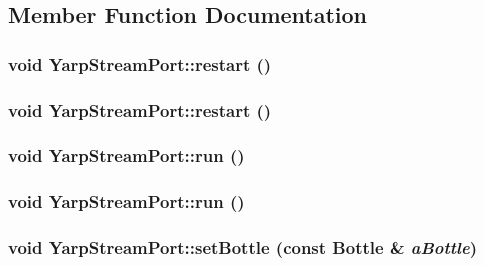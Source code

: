 \subsection{Member Function Documentation}
\hypertarget{class_yarp_stream_port_acc997d769ece47a6c88b1437225c0039}{
\subsubsection[{restart}]{\setlength{\rightskip}{0pt plus 5cm}void YarpStreamPort::restart ()}}
\label{class_yarp_stream_port_acc997d769ece47a6c88b1437225c0039}
\hypertarget{class_yarp_stream_port_acc997d769ece47a6c88b1437225c0039}{
\subsubsection[{restart}]{\setlength{\rightskip}{0pt plus 5cm}void YarpStreamPort::restart ()}}
\label{class_yarp_stream_port_acc997d769ece47a6c88b1437225c0039}
\hypertarget{class_yarp_stream_port_aaeea4c0a2bae6c5a257935227df3cddb}{
\subsubsection[{run}]{\setlength{\rightskip}{0pt plus 5cm}void YarpStreamPort::run ()}}
\label{class_yarp_stream_port_aaeea4c0a2bae6c5a257935227df3cddb}
\hypertarget{class_yarp_stream_port_aaeea4c0a2bae6c5a257935227df3cddb}{
\subsubsection[{run}]{\setlength{\rightskip}{0pt plus 5cm}void YarpStreamPort::run ()}}
\label{class_yarp_stream_port_aaeea4c0a2bae6c5a257935227df3cddb}
\hypertarget{class_yarp_stream_port_a6c55a434cf560c89f93d1a7d02b42a98}{
\subsubsection[{setBottle}]{\setlength{\rightskip}{0pt plus 5cm}void YarpStreamPort::setBottle (const Bottle \& {\em aBottle})}}
